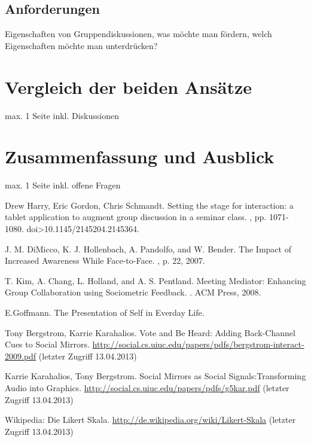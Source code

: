 \documentclass{seminarvorlage}
\begin{document}
\subsection{Anforderungen}
Eigenschaften von Gruppendiskussionen, was möchte man fördern, welch Eigenschaften möchte man unterdrücken?





\section{Vergleich der beiden Ansätze}
max. 1 Seite
inkl. Diskussionen



\section{Zusammenfassung und Ausblick}
max. 1 Seite
inkl. offene Fragen
% 

\begin{thebibliography}{9}

Drew Harry, Eric Gordon, Chris Schmandt.
\newblock Setting the stage for interaction: a tablet application to augment group discussion in a seminar class. 
, pp. 1071-1080. doi>10.1145/2145204.2145364. 

J. M. DiMicco, K. J. Hollenbach, A. Pandolfo, and W. Bender.
\newblock The Impact of Increased Awareness While Face-to-Face.
, p. 22, 2007.

T. Kim, A. Chang, L. Holland, and A. S. Pentland.
\newblock Meeting Mediator: Enhancing Group Collaboration using Sociometric Feedback. 
. ACM Press, 2008.

E.Goffmann.
\newblock The Presentation of Self in Everday Life.

Tony Bergstrom, Karrie Karahalios. 
\newblock Vote and Be Heard: Adding Back-Channel Cues to Social Mirrors.
 \url {http://social.cs.uiuc.edu/papers/pdfs/bergstrom-interact-2009.pdf} (letzter Zugriff 13.04.2013)

Karrie Karahalios, Tony Bergstrom. 
\newblock Social Mirrors as Social Signals:Transforming Audio into Graphics.
 \url {http://social.cs.uiuc.edu/papers/pdfs/g5kar.pdf} (letzter Zugriff 13.04.2013)


Wikipedia: Die Likert Skala.
\newblock \url {http://de.wikipedia.org/wiki/Likert-Skala} (letzter Zugriff 13.04.2013)

\end{thebibliography}
\end{document}

